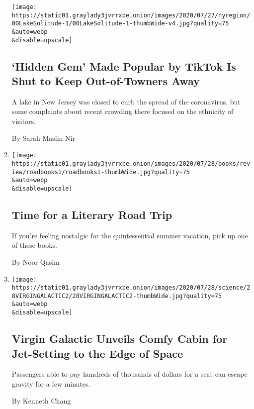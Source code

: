 \begin{enumerate}
  \texttt{[image: https://static01.graylady3jvrrxbe.onion/images/2020/07/27/nyregion/00LakeSolitude-1/00LakeSolitude-1-thumbWide-v4.jpg?quality=75\\\&auto=webp\\\&disable=upscale]}

  \hypertarget{hidden-gem-made-popular-by-tiktok-is-shut-to-keep-out-of-towners-away}{%
  \subsection{`Hidden Gem' Made Popular by TikTok Is Shut to Keep
  Out-of-Towners
  Away}\label{hidden-gem-made-popular-by-tiktok-is-shut-to-keep-out-of-towners-away}}

  A lake in New Jersey was closed to curb the spread of the coronavirus,
  but some complaints about recent crowding there focused on the
  ethnicity of visitors.

  By Sarah Maslin Nir
\item
  \href{/2020/07/28/books/time-for-a-literary-road-trip.html}{}

  \texttt{[image: https://static01.graylady3jvrrxbe.onion/images/2020/07/28/books/review/roadbooks1/roadbooks1-thumbWide.jpg?quality=75\\\&auto=webp\\\&disable=upscale]}

  \hypertarget{time-for-a-literary-road-trip}{%
  \subsection{Time for a Literary Road
  Trip}\label{time-for-a-literary-road-trip}}

  If you're feeling nostalgic for the quintessential summer vacation,
  pick up one of these books.

  By Noor Qasim
\item
  \href{/2020/07/28/science/virgin-galactic-cabin.html}{}

  \texttt{[image: https://static01.graylady3jvrrxbe.onion/images/2020/07/28/science/28VIRGINGALACTIC2/28VIRGINGALACTIC2-thumbWide.jpg?quality=75\\\&auto=webp\\\&disable=upscale]}

  \hypertarget{virgin-galactic-unveils-comfy-cabin-for-jet-setting-to-the-edge-of-space}{%
  \subsection{Virgin Galactic Unveils Comfy Cabin for Jet-Setting to the
  Edge of
  Space}\label{virgin-galactic-unveils-comfy-cabin-for-jet-setting-to-the-edge-of-space}}

  Passengers able to pay hundreds of thousands of dollars for a seat can
  escape gravity for a few minutes.

  By Kenneth Chang
\end{enumerate}

